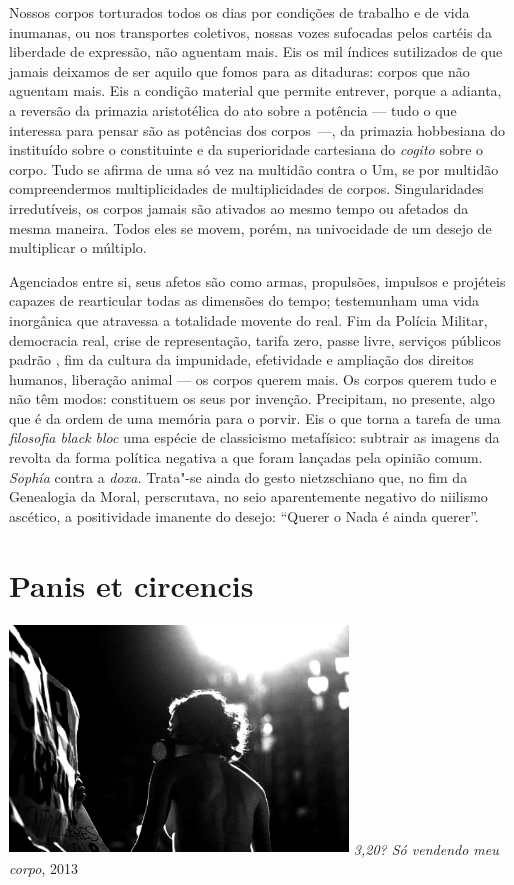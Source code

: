 Nossos corpos torturados todos os dias por condições de trabalho e de
vida inumanas, ou nos transportes coletivos, nossas vozes sufocadas
pelos cartéis da liberdade de expressão, não aguentam mais. Eis os mil
índices sutilizados de que jamais deixamos de ser aquilo que fomos para
as ditaduras: corpos que não aguentam mais. Eis a condição material que
permite entrever, porque a adianta, a reversão da primazia aristotélica
do ato sobre a potência --- tudo o que interessa para pensar são as
potências dos corpos~---, da primazia hobbesiana do instituído sobre o
constituinte e da superioridade cartesiana do \emph{cogito }sobre o
corpo. Tudo se afirma de uma só vez na multidão contra o Um, se por
multidão compreendermos multiplicidades de multiplicidades de corpos.
Singularidades irredutíveis, os corpos jamais são ativados ao mesmo
tempo ou afetados da mesma maneira. Todos eles se movem, porém, na
univocidade de um desejo de multiplicar o múltiplo.

Agenciados entre si, seus afetos são como armas, propulsões, impulsos e
projéteis capazes de rearticular todas as dimensões do tempo;
testemunham uma vida inorgânica que atravessa a totalidade movente do
real. Fim da Polícia Militar, democracia real, crise de representação,
tarifa zero, passe livre, serviços públicos padrão , fim da cultura
da impunidade, efetividade e ampliação dos direitos humanos, liberação
animal --- os corpos querem mais. Os corpos querem tudo e não têm modos:
constituem os seus por invenção. Precipitam, no presente, algo que é da
ordem de uma memória para o porvir. Eis o que torna a tarefa de uma
\emph{filosofia black bloc} uma espécie de classicismo metafísico:
subtrair as imagens da revolta da forma política negativa a que foram
lançadas pela opinião comum. \emph{Sophía} contra a \emph{doxa.}
Trata"-se ainda do gesto nietzschiano que, no fim da Genealogia da Moral,
perscrutava, no seio aparentemente negativo do niilismo ascético, a
positividade imanente do desejo: ``Querer o Nada é ainda querer''.

\chapter{Panis et circencis}

\begin{center}
\includegraphics[width=9cm,height=6.1cm]{Imgs/img3.jpg}
\emph{3,20? Só vendendo meu corpo}, 2013
\end{center}

